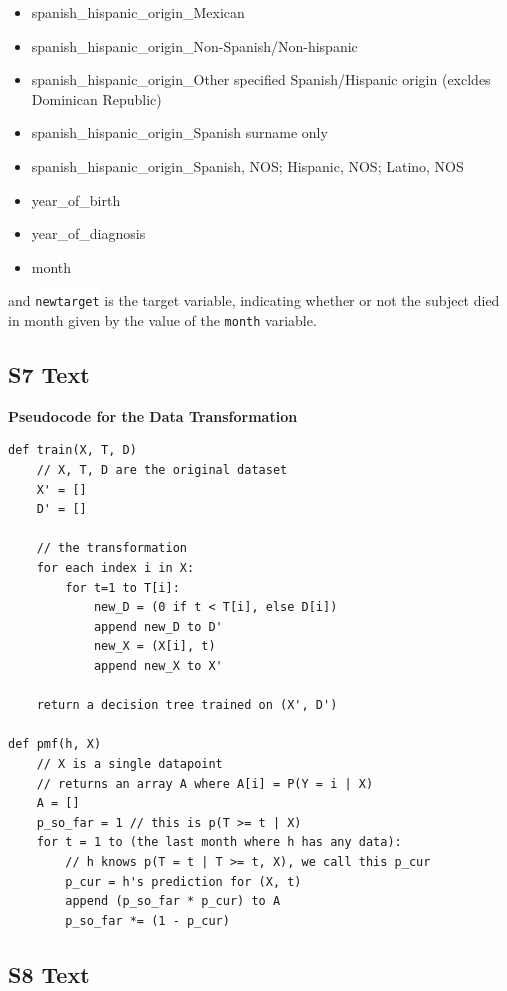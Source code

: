 \documentclass[10pt,letterpaper]{article}
\newcommand{\codewhite}[1]{\colorbox{white}{\texttt{#1}}}
\begin{document}
\begin{itemize}[noitemsep]
\item spanish\_hispanic\_origin\_Mexican
\item spanish\_hispanic\_origin\_Non-Spanish/Non-hispanic
\item spanish\_hispanic\_origin\_Other specified Spanish/Hispanic origin (excldes Dominican Republic)
\item spanish\_hispanic\_origin\_Spanish surname only
\item spanish\_hispanic\_origin\_Spanish, NOS; Hispanic, NOS; Latino, NOS
\item year\_of\_birth
\item year\_of\_diagnosis
\item month
\end{itemize}

and 
\codewhite{newtarget} is the target variable, indicating whether or not the subject died in month given by the value of the \codewhite{month} variable.






\subsection*{S7 Text}
\label{S7_Text}

{\bf Pseudocode for the Data Transformation}

\begin{verbatim}
def train(X, T, D)
    // X, T, D are the original dataset
    X' = []
    D' = []

    // the transformation
    for each index i in X:
        for t=1 to T[i]:
            new_D = (0 if t < T[i], else D[i])
            append new_D to D'
            new_X = (X[i], t)
            append new_X to X'

    return a decision tree trained on (X', D')

def pmf(h, X)
    // X is a single datapoint
    // returns an array A where A[i] = P(Y = i | X)
    A = []
    p_so_far = 1 // this is p(T >= t | X)
    for t = 1 to (the last month where h has any data):
        // h knows p(T = t | T >= t, X), we call this p_cur
        p_cur = h's prediction for (X, t)
        append (p_so_far * p_cur) to A
        p_so_far *= (1 - p_cur)

\end{verbatim}

\subsection*{S8 Text}
\label{S8_Text}
\end{document}
